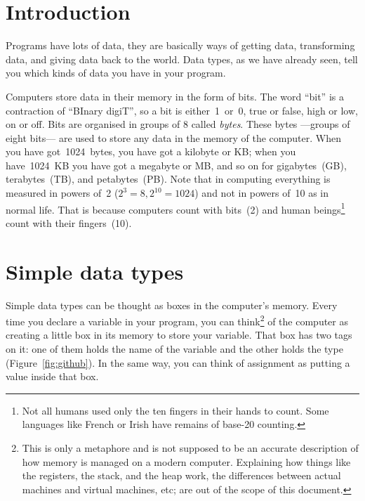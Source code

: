 


%
%
%

\section{Introduction}
\label{sec:introduction}

Programs have lots of data, they are basically
ways of getting data, transforming data, and giving data back to the
world. 
%
Data types, as we have already seen, tell you which kinds of data you
have in your program. 

Computers store data in their memory in the form of bits. The word
``bit'' is a contraction of ``BInary digiT'', so a bit is
either~1~or~0, true or false, high or low, on or off. Bits are
organised in groups of 8 called \emph{bytes}. These bytes ---groups of
eight bits--- are used to store any data in the memory of the
computer. When you have got~1024~bytes, you have got a kilobyte or KB;
when you have~1024~KB you have got a megabyte or MB, and so on for
gigabytes~(GB), terabytes~(TB), and petabytes~(PB). Note that in
computing everything is measured in powers of~2 ($2^3 = 8, 2^{10} =
1024$) and not in powers of~10 as in normal life. That is because
computers count with bits~(2) and human beings\footnote{Not all humans
used only the ten fingers in their hands to count. Some languages like
French or Irish have remains of base-20 counting.} count with their
fingers~(10). 

\section{Simple data types}
\label{sec:simple-data-types}

Simple data types can be thought as boxes in the computer's
memory. Every time you declare a variable in your program, you can
think\footnote{This is only a metaphore and is not supposed to be an
  accurate description of how memory is managed on a modern
  computer. Explaining how things like the registers, the stack, and
  the heap work, the differences between actual machines and virtual
  machines, etc; are out of the scope of this document.} of the
computer as creating a little box in its memory to store your
variable. That box has two tags on it: one of them holds the name of
the variable and the other holds the type
(Figure~\ref{fig:github}). In the same way, you can think of
assignment as putting a value inside that box. 

